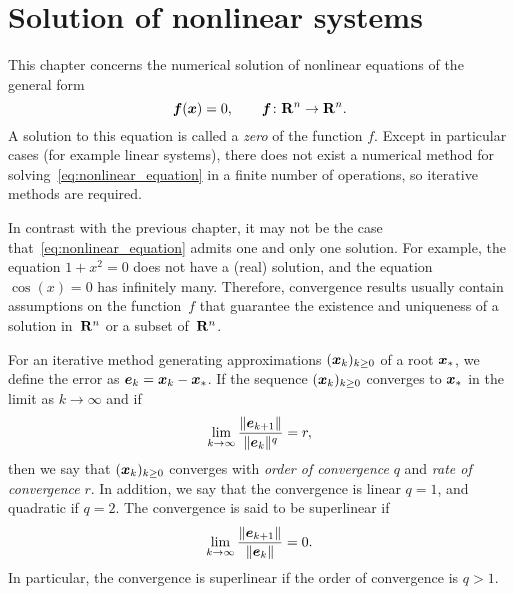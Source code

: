 \chapter{Solution of nonlinear systems}
\label{cha:solution_of_nonlinear_systems}

This chapter concerns the numerical solution of nonlinear equations of the general form
\begin{equation}
    \label{eq:nonlinear_equation}
    \mathbf{\boldsymbol{f}}(\mathbf{\boldsymbol{x}}) = 0, \qquad \mathbf{\boldsymbol{f}}\colon \mathbf R^n \to \mathbf R^n.
\end{equation}
A solution to this equation is called a \emph{zero} of the function $f$.
Except in particular cases (for example linear systems),
there does not exist a numerical method for solving~\eqref{eq:nonlinear_equation} in a finite number of operations,
so iterative methods are required.

In contrast with the previous chapter,
it may not be the case that~\eqref{eq:nonlinear_equation} admits one and only one solution.
For example, the equation $1 + x^2 = 0$ does not have a (real) solution,
and the equation $\cos(x) = 0$ has infinitely many.
Therefore, convergence results usually contain assumptions on the function~$f$ that guarantee the existence and uniqueness of a solution in~$\mathbf R^n$ or a subset of~$\mathbf R^n$.

For an iterative method generating approximations $(\mathbf{\boldsymbol{x}}_k)_{k \geq 0}$ of a root $\mathbf{\boldsymbol{x}}_*$,
we define the error as $\mathbf{\boldsymbol{e}}_k = \mathbf{\boldsymbol{x}}_k - \mathbf{\boldsymbol{x}}_*$.
If the sequence $(\mathbf{\boldsymbol{x}}_k)_{k \geq 0}$ converges to $\mathbf{\boldsymbol{x}}_*$ in the limit as $k \to \infty$
and if
\begin{equation}
    \label{eq:rate_of_convergence}
    \lim_{k \to \infty} \frac{\lVert\mathbf{\boldsymbol{e}}_{k+1}\rVert}{\lVert\mathbf{\boldsymbol{e}}_k\rVert^q} = r,
\end{equation}
then we say that $(\mathbf{\boldsymbol{x}}_k)_{k \geq 0}$ converges with \emph{order of convergence} $q$ and
\emph{rate of convergence} $r$.
In addition, we say that the convergence is linear $q = 1$,
and quadratic if $q = 2$.
The convergence is said to be superlinear if
\begin{equation}
    \label{eq:superlinear}
    \lim_{k \to \infty} \frac{\lVert\mathbf{\boldsymbol{e}}_{k+1}\rVert}{\lVert\mathbf{\boldsymbol{e}}_k\rVert} = 0.
\end{equation}
In particular,
the convergence is superlinear if the order of convergence is $q > 1$.

